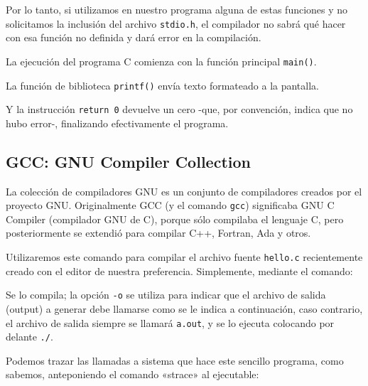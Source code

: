 \documentclass[11pt,a4paper]{article}
\newcommand{\inputcode}[2][]{%
  \par\noindent\begin{minipage}{\linewidth}
    
  \end{minipage}\par}
\begin{document}
Por lo tanto, si utilizamos en nuestro programa alguna de estas funciones y no solicitamos la inclusión del archivo \lstinline!stdio.h!, el compilador no sabrá qué hacer con esa función no definida y dará error en la compilación.

La ejecución del programa C comienza con la función principal \lstinline!main()!.

La función de biblioteca \lstinline!printf()! envía texto formateado a la pantalla.

Y la instrucción \lstinline!return 0! devuelve un cero -que, por convención, indica que no hubo error-, finalizando efectivamente el programa.

\subsection{GCC: GNU Compiler Collection}

La colección de compiladores GNU es un conjunto de compiladores creados por el proyecto GNU. Originalmente GCC (y el comando \lstinline!gcc!) significaba GNU C Compiler (compilador GNU de C), porque sólo compilaba el lenguaje C, pero posteriormente se extendió para compilar C++, Fortran, Ada y otros.

Utilizaremos este comando para compilar el archivo fuente \lstinline!hello.c! recientemente creado con el editor de nuestra preferencia. Simplemente, mediante el comando:

\inputcode[language=bash]{../examples/tp1/hello/hello.session}

Se lo compila; la opción \lstinline!-o! se utiliza para indicar que el archivo de salida (output) a generar debe llamarse como se le indica a continuación, caso contrario, el archivo de salida siempre se llamará \lstinline!a.out!, y se lo ejecuta colocando por delante \lstinline!./!.

Podemos trazar las llamadas a sistema que hace este sencillo programa, como sabemos, anteponiendo el comando «strace» al ejecutable:
\end{document}

